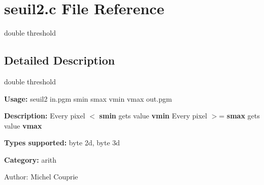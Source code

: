 \section{seuil2.c File Reference}
\label{seuil2_8c}
double threshold  




\label{_details}
\subsection{Detailed Description}
double threshold 

{\bf Usage:} seuil2 in.pgm smin smax vmin vmax out.pgm

{\bf Description:} Every pixel $<$ {\bf smin} gets value {\bf vmin} Every pixel $>$= {\bf smax} gets value {\bf vmax} 

{\bf Types supported:} byte 2d, byte 3d

{\bf Category:} arith

\begin{Desc}
\item[Author:]Michel Couprie \end{Desc}
